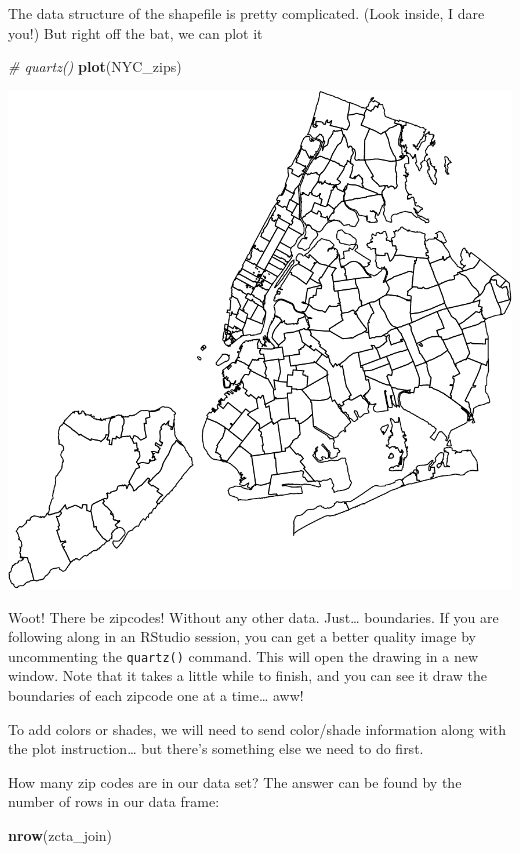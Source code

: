 \documentclass[openany]{book}
\newenvironment{Shaded}{\begin{snugshade}}{\end{snugshade}}
\newcommand{\CommentTok}[1]{\textcolor[rgb]{0.56,0.35,0.01}{\textit{#1}}}
\newcommand{\KeywordTok}[1]{\textcolor[rgb]{0.13,0.29,0.53}{\textbf{#1}}}
\newcommand{\NormalTok}[1]{#1}
\begin{document}
The data structure of the shapefile is pretty complicated. (Look inside, I dare you!)
But right off the bat, we can plot it

\begin{Shaded}
\begin{Highlighting}[]
\CommentTok{# quartz()}
\KeywordTok{plot}\NormalTok{(NYC_zips)}
\end{Highlighting}
\end{Shaded}

\begin{center}\includegraphics[width=0.9\linewidth]{figs/unnamed-chunk-81-1} \end{center}

Woot! There be zipcodes! Without any other data. Just\ldots{} boundaries. If you are following along in an RStudio session, you can get a better quality image by uncommenting the \texttt{quartz()} command. This will open the drawing in a new window. Note that it takes a little while to finish, and you can see it draw the boundaries of each zipcode one at a time\ldots{} aww!

To add colors or shades, we will need to send color/shade information along with the plot instruction\ldots{} but there's something else we need to do first.

How many zip codes are in our data set? The answer can be found by the number of rows in our data frame:

\begin{Shaded}
\begin{Highlighting}[]
\KeywordTok{nrow}\NormalTok{(zcta_join)}
\end{Highlighting}
\end{Shaded}
\end{document}
